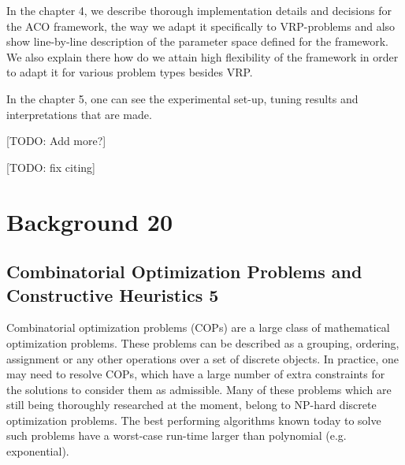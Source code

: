 \documentclass[11pt,a4paper,oneside]{book}
\begin{document}
In the chapter 4, we describe thorough implementation details and decisions for the ACO framework, the way we adapt it specifically to VRP-problems and also show line-by-line description of the parameter space defined for the framework. We also explain there how do we attain high flexibility of the framework in order to adapt it for various problem types besides VRP.

In the chapter 5, one can see the experimental set-up, tuning results and interpretations that are made.

[TODO: Add more?] \newline

[TODO: fix citing] \newline


\chapter{Background 20}

\section{Combinatorial Optimization Problems and Constructive Heuristics 5}

Combinatorial optimization problems (COPs) are a large class of mathematical optimization problems. These problems can be described as a grouping, ordering, assignment or any other operations over a set of discrete objects. In practice, one may need to resolve COPs, which have a large number of extra constraints for the solutions to consider them as admissible. Many of these problems which are still being thoroughly researched at the moment, belong to NP-hard discrete optimization problems. The best performing algorithms known today to solve such problems have a worst-case run-time larger than polynomial (e.g. exponential).

\noindent{}
\end{document}
